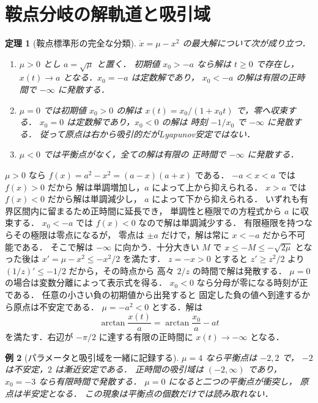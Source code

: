\documentclass[a5paper,10pt,onecolumn]{jsarticle}
\makeatletter
\theoremstyle{mathnotetheorem}
\newtheorem{theorem}{定理}[section]
\newtheorem{example}[theorem]{例}
\renewcommand{\proofname}{証明}
\renewenvironment{proof}[1][\proofname]{%
  \par\pushQED{\qed}\normalfont\topsep4\p@\@plus2\p@\relax
  \trivlist\item[\hskip\labelsep\bfseries #1]\ignorespaces
}{\popQED\endtrivlist\@endpefalse}
\makeatother
\begin{document}
\section{鞍点分岐の解軌道と吸引域}
\begin{theorem}[鞍点標準形の完全な分類]\label{thm:saddle-complete}
$\dot x=\mu-x^2$ の最大解について次が成り立つ．
\begin{enumerate}
\item $\mu>0$ とし $a=\sqrt\mu$ と置く．
 初期値 $x_0>-a$ なら解は $t\ge0$ で存在し，
 $x(t)\to a$ となる．$x_0=-a$ は定数解であり，
 $x_0<-a$ の解は有限の正時間で $-\infty$ に発散する．
\item $\mu=0$ では初期値 $x_0>0$ の解は
 $x(t)=x_0/(1+x_0t)$ で，零へ収束する．
 $x_0=0$ は定数解であり，$x_0<0$ の解は
 時刻 $-1/x_0$ で $-\infty$ に発散する．
 従って原点は右から吸引的だがLyapunov安定ではない．
\item $\mu<0$ では平衡点がなく，全ての解は有限の
 正時間で $-\infty$ に発散する．
\end{enumerate}
\end{theorem}
\begin{proof}
$\mu>0$ なら
$f(x)=a^2-x^2=(a-x)(a+x)$ である．
$-a<x<a$ では $f(x)>0$ だから
解は単調増加し，$a$ によって上から抑えられる．
$x>a$ では $f(x)<0$ だから解は単調減少し，
$a$ によって下から抑えられる．
いずれも有界区間内に留まるため正時間に延長でき，
単調性と極限での方程式から $a$ に収束する．
$x_0<-a$ では $f(x)<0$ なので解は単調減少する．
有限極限を持つならその極限は零点になるが，
零点は $\pm a$ だけで，解は常に $x<-a$ だから不可能である．
そこで解は $-\infty$ に向かう．十分大きい $M$ で
$x\le-M\le-\sqrt{2\mu}$ となった後は
$x'=\mu-x^2\le-x^2/2$ を満たす．
$z=-x>0$ とすると $z'\ge z^2/2$ より
$(1/z)'\le-1/2$ だから，その時点から
高々 $2/z$ の時間で解は発散する．
$\mu=0$ の場合は変数分離によって表示式を得る．
$x_0<0$ なら分母が零になる時刻が正である．
任意の小さい負の初期値から出発すると
固定した負の値へ到達するから原点は不安定である．
$\mu=-a^2<0$ とする．解は
\[
 \arctan\frac{x(t)}a
 =\arctan\frac{x_0}a-at
\]
を満たす．右辺が $-\pi/2$ に達する有限の正時間に
$x(t)\to-\infty$ となる．
\end{proof}
\begin{example}[パラメータと吸引域を一緒に記録する]
$\mu=4$ なら平衡点は $-2,2$ で，
$-2$ は不安定，$2$ は漸近安定である．
正時間の吸引域は $(-2,\infty)$ であり，
$x_0=-3$ なら有限時間で発散する．
$\mu=0$ になると二つの平衡点が衝突し，
原点は半安定となる．
この現象は平衡点の個数だけでは読み取れない．
\end{example}
\end{document}
